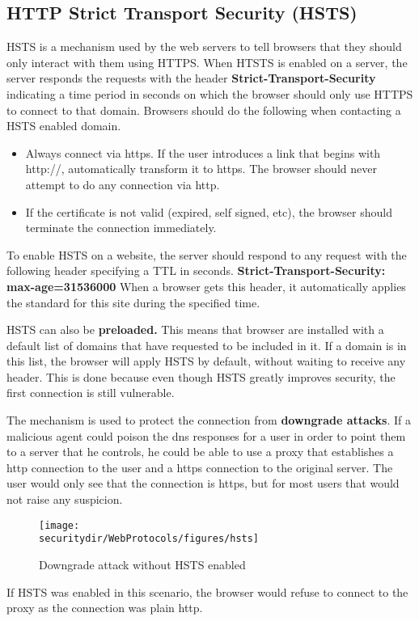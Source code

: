 \subsection{HTTP Strict Transport Security (HSTS)} 
HSTS is a mechanism used by the web servers to tell browsers that they should only interact with them using HTTPS. When HTSTS is enabled on a server, the server responds the requests with the header \textbf{Strict-Transport-Security} indicating a time period in seconds on which the browser should only use HTTPS to connect to that domain. Browsers should do the following when contacting a HSTS enabled domain.
\begin{itemize}
	\item Always connect via https. If the user introduces a link that begins with http://, automatically transform it to https. The browser should never attempt to do any connection via http.
	\item If the certificate is not valid (expired, self signed, etc), the browser should terminate the connection immediately.
\end{itemize}

To enable HSTS on a website, the server should respond to any request with the following header specifying a TTL in seconds.
\textbf{Strict-Transport-Security: max-age=31536000}
When a browser gets this header, it automatically applies the standard for this site during the specified time.

HSTS can also be \textbf{preloaded.} This means that browser are installed with a default list of domains that have requested to be included in it. If a domain is in this list, the browser will apply HSTS by default, without waiting to receive any header. This is done because even though HSTS greatly improves security, the first connection is still vulnerable.

The mechanism is used to protect the connection from \textbf{downgrade attacks}. If a malicious agent could poison the dns responses for a user in order to point them to a server that he controls, he could be able to use a proxy that establishes a http connection to the user and a https connection to the original server. The user would only see that the connection is https, but for most users that would not raise any suspicion.

\begin{figure}[htb]
	\begin{centering}
		\texttt{[image: \\securitydir/WebProtocols/figures/hsts]}
		\par
	\end{centering}
	\caption{\label{fig:hsts} Downgrade attack without HSTS enabled}
\end{figure}

If HSTS was enabled in this scenario, the browser would refuse to connect to the proxy as the connection was plain http. 